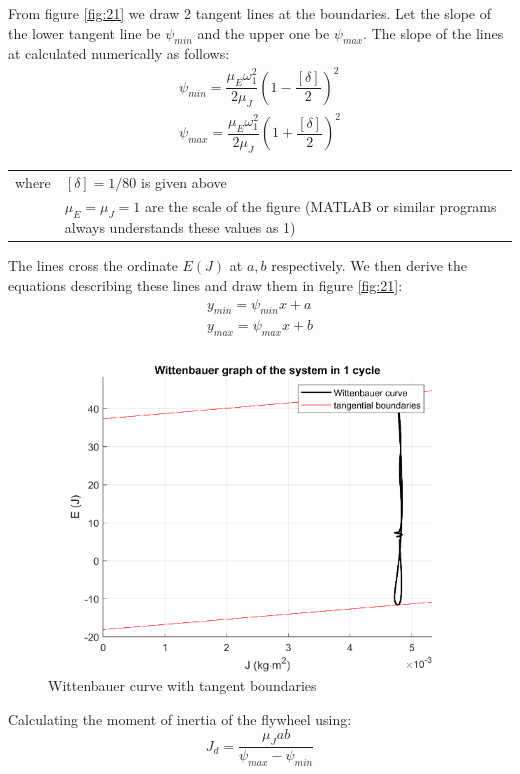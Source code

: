 From figure \ref{fig:21} we draw 2 tangent lines at the boundaries. Let the slope of the lower tangent line be $ \psi_{min} $ and the upper one be $ \psi_{max} $. The slope of the lines at calculated numerically as follows:
\begin{equation}
\begin{array}{c}
\psi_{min}=\dfrac{\mu_E\omega_1^2}{2\mu_J}\left(1-\dfrac{[\delta]}{2}\right)^2\\
\psi_{max}=\dfrac{\mu_E\omega_1^2}{2\mu_J}\left(1+\dfrac{[\delta]}{2}\right)^2
\end{array}
\end{equation}
\begin{tabular}{p{2cm}p{13.5cm}}
	where & $ [\delta]=1/80 $ is given above\\
	 & $ \mu_E=\mu_J =1$ are the scale of the figure (MATLAB\textup{\textregistered} or similar programs always understands these values as 1)
\end{tabular}

The lines cross the ordinate $ E(J) $ at $ a, b $ respectively. We then derive the equations describing these lines and draw them in figure \ref{fig:21}:
\begin{equation}
	\begin{array}{c}
	y_{min}=\psi_{min} x + a\\
	y_{max}=\psi_{max} x + b
	\end{array}
\end{equation}
\begin{figure}
	\centering
	\includegraphics[width=0.6\linewidth]{22}
	\caption{Wittenbauer curve with tangent boundaries}
	\label{fig:22}
\end{figure}

Calculating the moment of inertia of the flywheel using:
\begin{equation}
	J_d=\dfrac{\mu_J ab}{\psi_{max}-\psi_{min}}
\end{equation}

